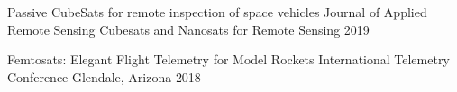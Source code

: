 
\begin{cvhonors}

  \cvhonor
  {Passive CubeSats for remote inspection of space vehicles} %
  {Journal of Applied Remote Sensing} %
  {Cubesats and Nanosats for Remote Sensing} %
    {2019} %
  
  \cvhonor
  {Femtosats: Elegant Flight Telemetry for Model Rockets} %
  {International Telemetry Conference} %
  {Glendale, Arizona} %
    {2018} %

\end{cvhonors}
